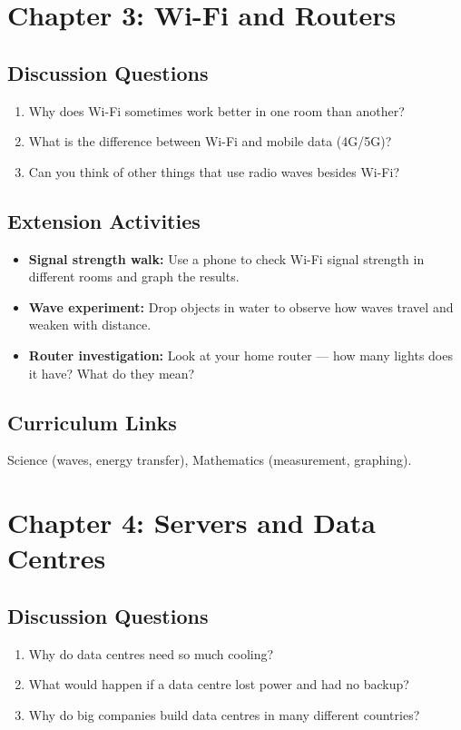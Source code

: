 \section*{Chapter 3: Wi-Fi and Routers}

\subsection*{Discussion Questions}
\begin{enumerate}
  \item Why does Wi-Fi sometimes work better in one room than another?
  \item What is the difference between Wi-Fi and mobile data (4G/5G)?
  \item Can you think of other things that use radio waves besides Wi-Fi?
\end{enumerate}

\subsection*{Extension Activities}
\begin{itemize}
  \item \textbf{Signal strength walk:} Use a phone to check Wi-Fi signal strength in different rooms and graph the results.
  \item \textbf{Wave experiment:} Drop objects in water to observe how waves travel and weaken with distance.
  \item \textbf{Router investigation:} Look at your home router — how many lights does it have? What do they mean?
\end{itemize}

\subsection*{Curriculum Links}
Science (waves, energy transfer), Mathematics (measurement, graphing).

\sectionrule

\section*{Chapter 4: Servers and Data Centres}

\subsection*{Discussion Questions}
\begin{enumerate}
  \item Why do data centres need so much cooling?
  \item What would happen if a data centre lost power and had no backup?
  \item Why do big companies build data centres in many different countries?
\end{enumerate}

